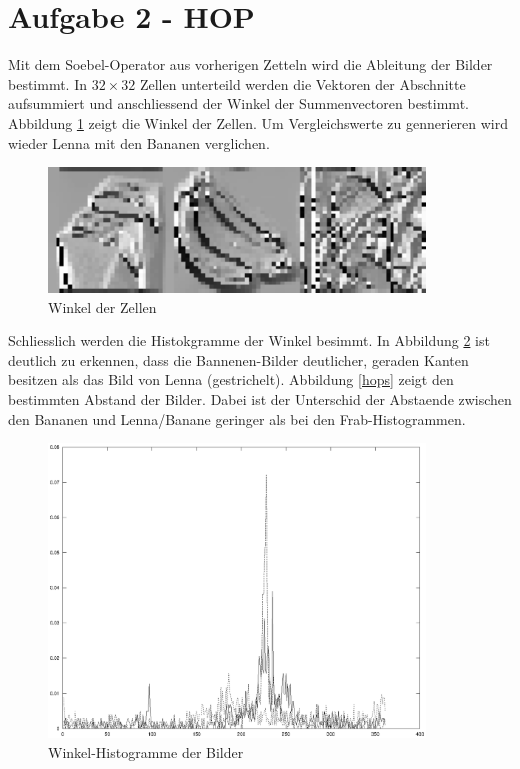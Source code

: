 \section*{Aufgabe 2 - HOP}

Mit dem Soebel-Operator aus vorherigen Zetteln wird die Ableitung der Bilder bestimmt. 
In $32\times 32$ Zellen unterteild werden die Vektoren der Abschnitte aufsummiert und anschliessend der Winkel der Summenvectoren bestimmt.
Abbildung \ref{theta} zeigt die Winkel der Zellen. Um Vergleichswerte zu gennerieren wird wieder Lenna mit den Bananen verglichen.

\begin{figure}[H]
\begin{center}
\includegraphics[width=100mm]{u09/the.eps}
\end{center}
\label{theta}
\caption{Winkel der Zellen}
\end{figure}

Schliesslich werden die Histokgramme der Winkel besimmt. In Abbildung \ref{thist} ist deutlich zu erkennen, 
dass die Bannenen-Bilder deutlicher, geraden Kanten besitzen als das Bild von Lenna (gestrichelt).
Abbildung \ref{hops} zeigt den bestimmten Abstand der Bilder. Dabei ist der Unterschid der Abstaende zwischen den Bananen und 
Lenna/Banane geringer als bei den Frab-Histogrammen.
\begin{figure}[H]
\begin{center}
\includegraphics[width=100mm]{u09/theta.eps}
\end{center}
\label{thist}
\caption{Winkel-Histogramme der Bilder}
\end{figure}


